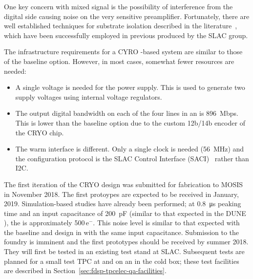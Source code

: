 One key concern with mixed signal  is the possibility of interference from the digital side causing noise on the very sensitive preamplifier. 
Fortunately, there are well established techniques for substrate isolation described in the literature~\cite{yeh}, which have been successfully employed in previous  produced by the SLAC group.%


The infrastructure requirements for a CYRO -based system are similar to those of the baseline option. However, in most cases, somewhat fewer resources are needed:
\begin{itemize}
\item{A single voltage is needed for the power supply. This is used to generate two supply voltages using internal voltage regulators.}
\item{The output digital bandwidth on each of the four lines in an  is \SI{896}{Mbps}. This is lower than the baseline option due to the custom 12b/14b encoder of the CRYO chip. }
\item{The warm interface is different. Only a single clock is needed (\SI{56}{MHz}) and the configuration protocol is the SLAC  Control Interface (SACI)~\cite{SACI} rather than I2C.}
\end{itemize}

The first iteration of the CRYO  design was submitted for fabrication to MOSIS in November 2018.  The first protoypes are expected to be received in January, 2019. Simulation-based studies have already been performed; at \SI{0.8}{\micro\second} peaking time and an input capacitance of \SI{200}{pF} (similar to that expected in the DUNE ), the  is approximately \num{500}\,e$^-$.  This noise level is similar to that expected with the baseline  and   design in \lar with the same input capacitance.  Submission to the  foundry is imminent and the first prototypes should be received by summer 2018. They will first be tested in an existing test stand at SLAC. Subsequent tests are planned for a small test TPC at \fnal and on an  in the  cold box; these test facilities are described in Section~\ref{sec:fdsp-tpcelec-qa-facilities}.

